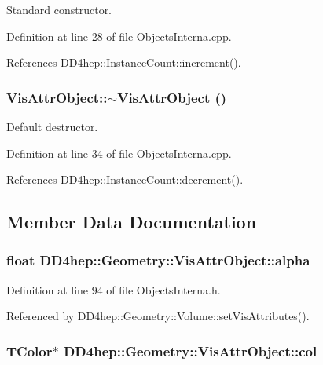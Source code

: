 Standard constructor. 

Definition at line 28 of file ObjectsInterna.cpp.

References DD4hep::InstanceCount::increment().\hypertarget{class_d_d4hep_1_1_geometry_1_1_vis_attr_object_afd52e626a97e4ddcfb911f16fcef517b}{
\subsubsection[{$\sim$VisAttrObject}]{\setlength{\rightskip}{0pt plus 5cm}VisAttrObject::$\sim$VisAttrObject ()}}
\label{class_d_d4hep_1_1_geometry_1_1_vis_attr_object_afd52e626a97e4ddcfb911f16fcef517b}


Default destructor. 

Definition at line 34 of file ObjectsInterna.cpp.

References DD4hep::InstanceCount::decrement().

\subsection{Member Data Documentation}
\hypertarget{class_d_d4hep_1_1_geometry_1_1_vis_attr_object_a9a5d2ab42c03b32cb5f69294881ac756}{
\subsubsection[{alpha}]{\setlength{\rightskip}{0pt plus 5cm}float {\bf DD4hep::Geometry::VisAttrObject::alpha}}}
\label{class_d_d4hep_1_1_geometry_1_1_vis_attr_object_a9a5d2ab42c03b32cb5f69294881ac756}


Definition at line 94 of file ObjectsInterna.h.

Referenced by DD4hep::Geometry::Volume::setVisAttributes().\hypertarget{class_d_d4hep_1_1_geometry_1_1_vis_attr_object_a5ac12c903f90e8cf16eb04ba55568f38}{
\subsubsection[{col}]{\setlength{\rightskip}{0pt plus 5cm}TColor$\ast$ {\bf DD4hep::Geometry::VisAttrObject::col}}}
\label{class_d_d4hep_1_1_geometry_1_1_vis_attr_object_a5ac12c903f90e8cf16eb04ba55568f38}



